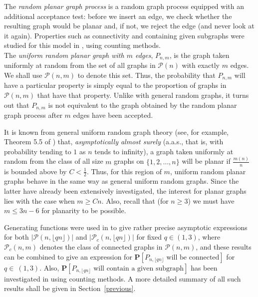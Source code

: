 \documentclass{article}
\newtheorem{Proof of Theorem}{Proof of Theorem}
\begin{document}
The \textit{random planar graph process}
is a random graph process equipped with an additional acceptance test:
before we insert an edge,
we check whether the resulting graph would be planar and, if not, 
we reject the edge (and never look at it again).
Properties such as connectivity and containing given subgraphs were studied for this model in \cite{ger4},
using counting methods. \\

The \textit{uniform random planar graph with $m$ edges}, $P_{n,m}$, is
the graph taken uniformly at random from the set of all graphs in $\mathcal{P}(n)$
with exactly $m$ edges.
We shall use $\mathcal{P}(n,m)$ to denote this set.
Thus, the probability that $P_{n,m}$ will have a particular property is simply equal to 
the proportion of graphs in $\mathcal{P}(n,m)$ that have that property.
Unlike with general random graphs, it turns out that $P_{n,m}$ is not equivalent to the graph
obtained by the random planar graph process after $m$ edges have been accepted.

It is known from general uniform random graph theory 
(see, for example, Theorem 5.5 of \cite{jan})
that, \textit{asymptotically almost surely}
(a.a.s., that is, with probability tending to $1$ as $n$ tends to infinity),
a graph taken uniformly at random from the class of all size $m$ graphs on $\{1,2, \ldots, n \}$
will be planar if $\frac{m(n)}{n}$ is bounded above by $C < \frac{1}{2}$.
Thus, for this region of $m$,
uniform random planar graphs behave in the same way as general uniform random graphs.
Since the latter have already been extensively investigated,
the interest for planar graphs lies with the case when $m \geq Cn$.
Also, recall that (for $n \geq 3$) we must have $m \leq 3n-6$ for planarity to be possible.

Generating functions were used in \cite{gim} to give rather precise asymptotic expressions for both
$|\mathcal{P}(n, \lfloor qn \rfloor)|$ and $|\mathcal{P}_{c}(n, \lfloor qn \rfloor)|$ for fixed $q \in (1,3)$,
where $\mathcal{P}_{c}(n,m)$ denotes the class of connected graphs in $\mathcal{P}(n,m)$,
and these results can be combined to give an expression for 
$\mathbf{P}\left[P_{n,\lfloor qn \rfloor} \textrm{ will be connected}\right]$
for~$q \in~\!(1,3)$.
Also,  
$\mathbf{P}\left[P_{n,\lfloor qn \rfloor} \textrm{ will contain a given subgraph}\right]$
has been investigated in \cite{ger} using counting methods.
A more detailed summary of all such results shall be given in Section~\ref{previous}. \\ 
\\
\end{document}
